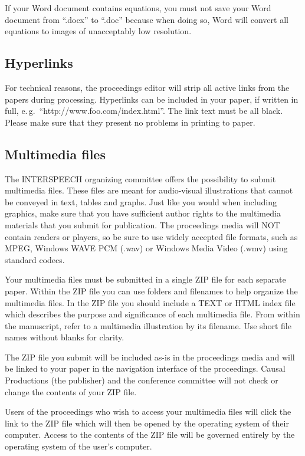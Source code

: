 \documentclass[a4paper]{article}
\begin{document}
If your Word document contains equations, you must not save your Word document from ``.docx'' to ``.doc'' because when doing so, Word will convert all equations to images of unacceptably low resolution.

\subsection{Hyperlinks}

For technical reasons, the proceedings editor will strip all active links from the papers during processing. Hyperlinks can be included in your paper, if written in full, e.\,g.\ ``http://www.foo.com/index.html''. The link text must be all black. 
Please make sure that they present no problems in printing to paper.

\subsection{Multimedia files}

The INTERSPEECH organizing committee offers the possibility to submit multimedia files. These files are meant for audio-visual illustrations that cannot be conveyed in text, tables and graphs. Just like you would when including graphics, make sure that you have sufficient author rights to the multimedia materials that you submit for publication. The proceedings media will NOT contain readers or players, so be sure to use widely accepted file formats, such as MPEG, Windows WAVE PCM (.wav) or Windows Media Video (.wmv) using standard codecs.

Your multimedia files must be submitted in a single ZIP file for each separate paper. Within the ZIP file you can use folders and filenames to help organize the multimedia files. In the ZIP file you should include a TEXT or HTML index file which describes the purpose and significance of each multimedia file. From within the manuscript, refer to a multimedia illustration by its filename. Use short file names without blanks for clarity.

The ZIP file you submit will be included as-is in the proceedings media and will be linked to your paper in the navigation interface of the proceedings. Causal Productions (the publisher) and the conference committee will not check or change the contents of your ZIP file.

Users of the proceedings who wish to access your multimedia files will click the link to the ZIP file which will then be opened by the operating system of their computer. Access to the contents of the ZIP file will be governed entirely by the operating system of the user's computer.
\end{document}
